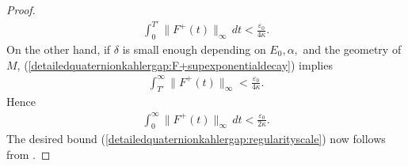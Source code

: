 \documentclass[12pt]{amsart}
\renewcommand{\1}{{\mathbf 1}}
\theoremstyle{others}
\numberwithin{equation}{section}
\begin{document}
\begin{proof}
    \begin{align*}
        \int_0^{T'} \|F^+(t)\|_\infty \, dt < \frac{\varepsilon_0}{4\kappa}.
    \end{align*} On the other hand, if \(\delta\) is small enough depending on \(E_0, \alpha,\) and the geometry of \(M\),  (\ref{detailedquaternionkahlergap:F+supexponentialdecay}) implies
    \begin{align*}
        \int_{T'}^\infty \|F^+(t)\|_\infty < \frac{\varepsilon_0}{4\kappa}.
    \end{align*} Hence
    \begin{align*}
        \int_0^\infty \|F^+(t)\|_\infty \, dt < \frac{\varepsilon_0}{2\kappa}. %
    \end{align*} The desired bound (\ref{detailedquaternionkahlergap:regularityscale}) now follows from \cite[Theorem 6.2]{oliveirawaldron}.

\end{proof}
\end{document}
